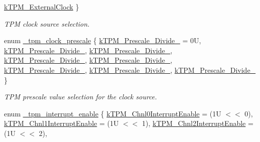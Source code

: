 \begin{DoxyCompactItemize}
\mbox{\hyperlink{group__tpm_ggac99d3a5e259dc4ca8b3d30a813490cdaa4857136cf43ac72ca82ed4bc0ed1cec8}{k\+T\+P\+M\+\_\+\+External\+Clock}}
 \}
\begin{DoxyCompactList}\small\item\em T\+PM clock source selection. \end{DoxyCompactList}\item 
enum \mbox{\hyperlink{group__tpm_gabb93e23246be90fb3bed0cae36875cef}{\+\_\+tpm\+\_\+clock\+\_\+prescale}} \{ \newline
\mbox{\hyperlink{group__tpm_ggabb93e23246be90fb3bed0cae36875cefa14017b91b63ac0c4c50aaf2226f79192}{k\+T\+P\+M\+\_\+\+Prescale\+\_\+\+Divide\+\_}} = 0U, 
\mbox{\hyperlink{group__tpm_ggabb93e23246be90fb3bed0cae36875cefac5cfc73fceeed177eee6ffd70dad2655}{k\+T\+P\+M\+\_\+\+Prescale\+\_\+\+Divide\+\_}}, 
\mbox{\hyperlink{group__tpm_ggabb93e23246be90fb3bed0cae36875cefaec0260e031a00fcb04f9f38b95a60dc5}{k\+T\+P\+M\+\_\+\+Prescale\+\_\+\+Divide\+\_}}, 
\mbox{\hyperlink{group__tpm_ggabb93e23246be90fb3bed0cae36875cefa2b43a6a117612827f1c697d9d3563877}{k\+T\+P\+M\+\_\+\+Prescale\+\_\+\+Divide\+\_}}, 
\newline
\mbox{\hyperlink{group__tpm_ggabb93e23246be90fb3bed0cae36875cefa2e56961b31ab965c48ac6eb7656f0e2a}{k\+T\+P\+M\+\_\+\+Prescale\+\_\+\+Divide\+\_}}, 
\mbox{\hyperlink{group__tpm_ggabb93e23246be90fb3bed0cae36875cefa8d656f4013cb72bffef9663568daa7c1}{k\+T\+P\+M\+\_\+\+Prescale\+\_\+\+Divide\+\_}}, 
\mbox{\hyperlink{group__tpm_ggabb93e23246be90fb3bed0cae36875cefac1e67b46fd2639f7c157f403b244a7f5}{k\+T\+P\+M\+\_\+\+Prescale\+\_\+\+Divide\+\_}}, 
\mbox{\hyperlink{group__tpm_ggabb93e23246be90fb3bed0cae36875cefaa5611bb8c5bee917cefdc5f4cffa2b17}{k\+T\+P\+M\+\_\+\+Prescale\+\_\+\+Divide\+\_}}
 \}
\begin{DoxyCompactList}\small\item\em T\+PM prescale value selection for the clock source. \end{DoxyCompactList}\item 
enum \mbox{\hyperlink{group__tpm_ga5974278413cf04de350a256f4fb6ad2c}{\+\_\+tpm\+\_\+interrupt\+\_\+enable}} \{ \newline
\mbox{\hyperlink{group__tpm_gga5974278413cf04de350a256f4fb6ad2cad09402c8e38b5aa03708dcd2bb35ac51}{k\+T\+P\+M\+\_\+\+Chnl0\+Interrupt\+Enable}} = (1U $<$$<$ 0), 
\mbox{\hyperlink{group__tpm_gga5974278413cf04de350a256f4fb6ad2caef3f216d32d09e6a5b3e9f9c4bb9f96d}{k\+T\+P\+M\+\_\+\+Chnl1\+Interrupt\+Enable}} = (1U $<$$<$ 1), 
\mbox{\hyperlink{group__tpm_gga5974278413cf04de350a256f4fb6ad2cac7cc9904d2a195053dbbbee00358b191}{k\+T\+P\+M\+\_\+\+Chnl2\+Interrupt\+Enable}} = (1U $<$$<$ 2), 
$$
\end{DoxyCompactItemize}
